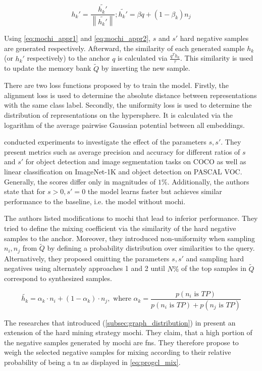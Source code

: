 \begin{equation}
    h_k' = \frac{\tilde{h_k'}}{\left\| \tilde{h_k'}  \right\|}; \tilde{h_k'} = \beta q + (1-\beta_k)n_j
    \label{eq:mochi_appr2}
\end{equation}

Using \eqref{eq:mochi_appr1} and \eqref{eq:mochi_appr2}, 
$s$ and $s'$ hard negative samples are generated respectively.
Afterward, the similarity of each generated sample $h_k$ (or $h_k'$ respectively) 
to the anchor $q$ is calculated via $\frac{q^T h_k}{\tau}$.
This similarity is used to update the memory bank $\tilde{Q}$ 
by inserting the new sample.

There are two loss functions proposed by \citet{mochi_2020} to train the model.
Firstly, the alignment loss is used to determine 
the absolute distance between representations with the same class label.
Secondly, the uniformity loss is used to determine 
the distribution of representations on the hypersphere.
It is calculated via the logarithm of the average pairwise Gaussian potential between all embeddings.

\citet{mochi_2020} conducted experiments to investigate the effect of the parameters $s, s'$.
They present metrics such as average precision and accuracy for different ratios of $s$ and $s'$ 
for object detection and image segmentation tasks on COCO as well as 
linear classification on ImageNet-1K and object detection on PASCAL VOC.
Generally, the scores differ only in magnitudes of $1 \%$.
Additionally, the authors state that for $s > 0, s' = 0$ the model learns faster but achieves similar performance to the baseline, i.e. the model without \ac{mochi}.


The authors listed modifications to \ac{mochi} that lead to inferior performance.
They tried to define the mixing coefficient via the similarity of the hard negative samples 
to the anchor. %
Moreover, they introduced non-uniformity when sampling $n_i, n_j$ from $\tilde{Q}$ by defining a 
probability distribution over similarities to the query. %
Alternatively, they proposed omitting the parameters $s, s'$ and 
sampling hard negatives using alternately approaches 1 and 2 until $N\%$ of the top samples in 
$\tilde{Q}$ correspond to synthesized samples.

\begin{equation}
    \tilde{h_k} =  \alpha_k \cdot n_i + (1-\alpha_k) \cdot  n_j, \text{ where } \alpha_k = \frac{p(n_i \text{ is } TP)}{p(n_i \text{ is } TP) + p(n_j \text{ is } TP)}
    \label{eq:progcl_mix}
\end{equation}

The researches that introduced \progcl{} (\autoref{subsec:graph_distribution}) in \citet{progcl_2022} 
present an extension of the hard mining strategy \ac{mochi}.%
They claim, that a high portion of the negative samples generated by \ac{mochi} are \acp{fn}.
They therefore propose to weigh the selected negative samples for mixing 
according to their relative probability of being a \ac{tn} as displayed in \eqref{eq:progcl_mix}.